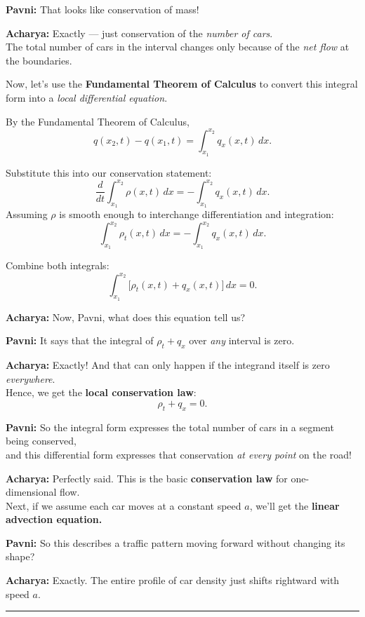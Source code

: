 \documentclass[
  letterpaper,
]{book}
\begin{document}
\textbf{Pavni:} That looks like conservation of mass!

\textbf{Acharya:} Exactly --- just conservation of the \emph{number of
cars}.\\
The total number of cars in the interval changes only because of the
\emph{net flow} at the boundaries.

Now, let's use the \textbf{Fundamental Theorem of Calculus} to convert
this integral form into a \emph{local differential equation}.

By the Fundamental Theorem of Calculus, \[
q(x_2,t) - q(x_1,t) = \int_{x_1}^{x_2} q_x(x,t)\,dx.
\]

Substitute this into our conservation statement: \[
\frac{d}{dt}\int_{x_1}^{x_2} \rho(x,t)\,dx = -\int_{x_1}^{x_2} q_x(x,t)\,dx.
\] Assuming \(\rho\) is smooth enough to interchange differentiation and
integration: \[
\int_{x_1}^{x_2} \rho_t(x,t)\,dx = -\int_{x_1}^{x_2} q_x(x,t)\,dx.
\]

Combine both integrals: \[
\int_{x_1}^{x_2} \big[\rho_t(x,t) + q_x(x,t)\big]\,dx = 0.
\]

\textbf{Acharya:} Now, Pavni, what does this equation tell us?

\textbf{Pavni:} It says that the integral of \(\rho_t + q_x\) over
\emph{any} interval is zero.

\textbf{Acharya:} Exactly! And that can only happen if the integrand
itself is zero \emph{everywhere}.\\
Hence, we get the \textbf{local conservation law}: \[
\boxed{\rho_t + q_x = 0.}
\]

\textbf{Pavni:} So the integral form expresses the total number of cars
in a segment being conserved,\\
and this differential form expresses that conservation \emph{at every
point} on the road!

\textbf{Acharya:} Perfectly said. This is the basic \textbf{conservation
law} for one-dimensional flow.\\
Next, if we assume each car moves at a constant speed \(a\), we'll get
the \textbf{linear advection equation.}

\textbf{Pavni:} So this describes a traffic pattern moving forward
without changing its shape?

\textbf{Acharya:} Exactly. The entire profile of car density just shifts
rightward with speed \(a\).

\begin{center}\rule{0.5\linewidth}{0.5pt}\end{center}
\end{document}
